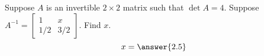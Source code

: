 \documentclass{ximera}
\author{}
\begin{document}
\begin{exercise}
Suppose $A$ is an invertible $2\times 2$ matrix such that $\det{A}=4$.  Suppose $A^{-1}=\begin{bmatrix}1 & x\\1/2 & 3/2\end{bmatrix}$.  Find $x$.
$$x=\answer{2.5}$$


 \end{exercise}
 
\end{document}
